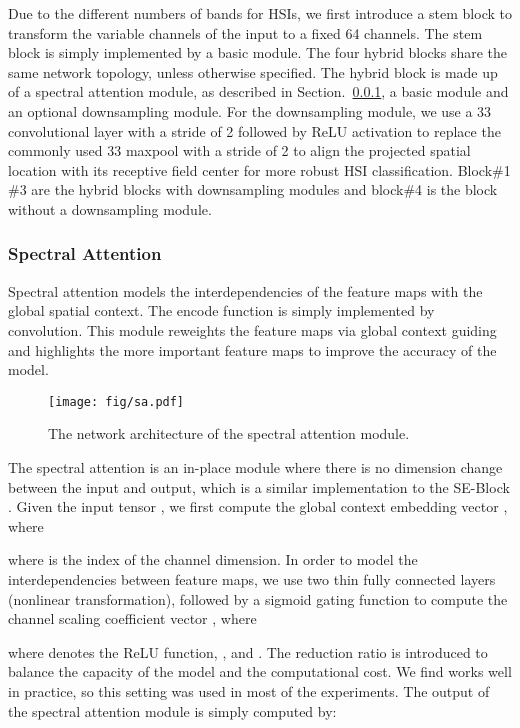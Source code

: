 \documentclass[journal]{IEEEtran}
\begin{document}
Due to the different numbers of bands for HSIs, we first introduce a stem block to transform the variable channels of the input to a fixed 64 channels.
The stem block is simply implemented by a basic module.
The four hybrid blocks share the same network topology, unless otherwise specified.
The hybrid block is made up of a spectral attention module, as described in Section.~\ref{sec:sa}, a basic module and an optional downsampling module.
For the downsampling module, we use a 33 convolutional layer with a stride of 2 followed by ReLU activation to replace the commonly used 33 maxpool with a stride of 2 to align the projected spatial location with its receptive field center for more robust HSI classification.
Block\#1  \#3 are the hybrid blocks with downsampling modules and block\#4 is the block without a downsampling module.

\subsubsection{\textbf{Spectral Attention}}
\label{sec:sa}
Spectral attention models the interdependencies of the feature maps with the global spatial context.
The encode function is simply implemented by  convolution.
This module reweights the feature maps via global context guiding and highlights the more important feature maps to improve the accuracy of the model.
\begin{figure}[hbt]
  \centering
  \texttt{[image: fig/sa.pdf]}
  \caption{The network architecture of the spectral attention module.}
  \label{fig:sa}
\end{figure}

The spectral attention is an in-place module where there is no dimension change between the input and output, which is a similar implementation to the SE-Block \cite{hu2018squeeze}.
Given the input tensor , we first compute the global context embedding vector , where

where  is the index of the channel dimension.
In order to model the interdependencies between feature maps, we use two thin fully connected layers (nonlinear transformation), followed by a sigmoid gating function to compute the channel scaling coefficient vector , where

where  denotes the ReLU function, , and .
The reduction ratio  is introduced to balance the capacity of the model and the computational cost.
We find  works well in practice, so this setting was used in most of the experiments.
The output  of the spectral attention module is simply computed by:
\end{document}
